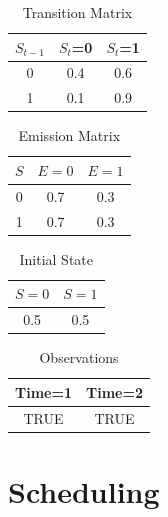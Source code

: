 \documentclass{article}
\begin{document}
\begin{table}[h!]
\caption{Transition Matrix}
\label{hmmfb1}
\begin{center}
\begin{tabular}{ |c||c|c| } 
\hline
 $S_{t-1}$ & $S_t$=0 & $S_t$=1\\
\hline
 0 & 0.4 & 0.6\\
 1 & 0.1 & 0.9\\
\hline
\end{tabular}
\end{center}
\end{table}
\begin{table}[h!]
\caption{Emission Matrix}
\label{hmmfb2}
\begin{center}
\begin{tabular}{ |c||c|c| } 
\hline
 $S$ & $E=0$ & $E=1$\\
\hline
 0 & 0.7 & 0.3\\
 1 & 0.7 & 0.3\\
\hline
\end{tabular}
\end{center}
\end{table}
\begin{table}[h!]
\caption{Initial State}
\label{hmmfb3}
\begin{center}
\begin{tabular}{ |c|c| } 
\hline
 $S=0$ & $S=1$\\
\hline
0.5 & 0.5\\
\hline
\end{tabular}
\end{center}
\end{table}
\begin{table}[h!]
\caption{Observations}
\label{hmmfb4}
\begin{center}
\begin{tabular}{ |c|c| } 
\hline
 Time=1 & Time=2\\
\hline
TRUE & TRUE\\
\hline
\end{tabular}
\end{center}
\end{table}
\clearpage
\section{Scheduling}
\end{document}
